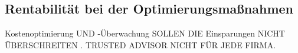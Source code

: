 \subsection*{Rentabilität bei der Optimierungsmaßnahmen}
Kostenoptimierung UND -Überwachung SOLLEN DIE Einsparungen NICHT ÜBERSCHREITEN . 
TRUSTED ADVISOR NICHT FÜR JEDE FIRMA.
\begin{comment}
Von Buch "Gestaltung"
  Schluss (Fazit)
Den Abschluss der Arbeit bildet die Zusammenfassung der wesentlichen
Ergebnisse, die folgende drei Punkte beinhaltet:
Beantwortung der Forschungsfrage, die Sie in der Einleitung
aufgeworfen haben.
Sinnstiftung der Arbeit: Für welchen Zweck sollen die Ergebnisse
verwendet werden?
Gegebenenfalls auch persönliche Bemerkungen und Bewertungen oder
ein kurzer Ausblick.
\end{tcolorbox}

\end{comment}



